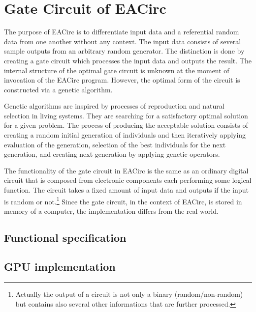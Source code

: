 \documentclass[12pt,oneside]{fithesis2}
\newcommand{\todo}{
	\noindent
	{\large\color{red}\textbf{TODO}}
}
\begin{document}
\chapter{Gate Circuit of EACirc}

The purpose of EACirc is to differentiate input data and a referential random data from one another without any context. The input data consists of several sample outputs from an arbitrary random generator. The distinction is done by creating a gate circuit which processes the input data and outputs the result. The internal structure of the optimal gate circuit is unknown at the moment of invocation of the EACirc program. However, the optimal form of the circuit is constructed via a genetic algorithm.~\cite{ukrop_thesis}

Genetic algorithms are inspired by processes of reproduction and natural selection in living systems. They are searching for a satisfactory optimal solution for a given problem. The process of producing the acceptable solution consists of creating a random initial generation of individuals and then iteratively applying evaluation of the generation, selection of the best individuals for the next generation, and creating next generation by applying genetic operators.~\cite{genetic_algorithms}

The functionality of the gate circuit in EACirc is the same as an ordinary digital circuit that is composed from electronic components each performing some logical function. The circuit takes a fixed amount of input data and outputs if the input is random or not.\footnote{Actually the output of a circuit is not only a binary (random/non-random) but contains also several other informations that are further processed.} Since the gate circuit, in the context of EACirc, is stored in memory of a computer, the implementation differs from the real world.




\section{Functional specification}
\section{GPU implementation}








\printbibliography[heading=bibintoc]
\end{document}

